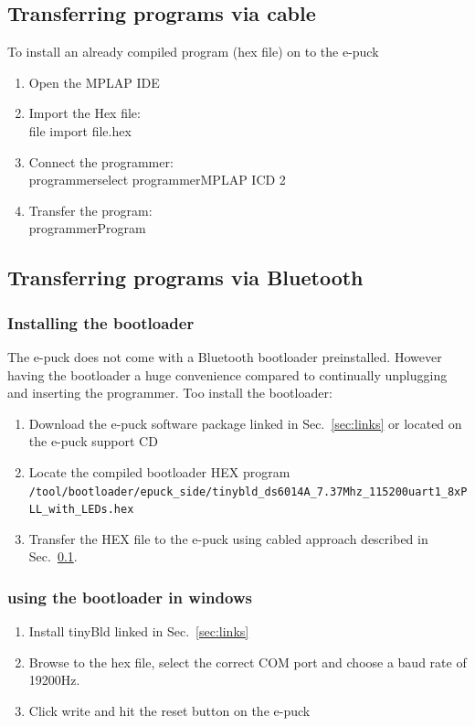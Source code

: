\documentclass{article}
\newcommand{\stt}[1]{{\small\tt #1}}
\begin{document}
\subsection{Transferring programs via cable}
\label{sec:transfering_cabel}
To install an already compiled program (hex file) on to the e-puck
\begin{enumerate}
\item Open the MPLAP IDE
\item Import the Hex file: 
\\ file \textrightarrow import \textrightarrow  file.hex
\item Connect the programmer: 
\\ programmer\textrightarrow select programmer\textrightarrow  MPLAP ICD 2
\item Transfer the program: 
\\ programmer\textrightarrow Program
\end{enumerate}


\subsection{Transferring programs via Bluetooth}
\subsubsection{Installing the bootloader}
The e-puck does not come with a Bluetooth bootloader preinstalled. However having the bootloader a huge convenience compared to continually unplugging and inserting the programmer.
%
Too install the bootloader:
\begin{enumerate}
\item Download the e-puck software package linked in Sec.~\ref{sec:links} or located on the e-puck support CD
\item Locate the compiled bootloader HEX program
\\ \stt{/tool/bootloader/epuck\_side/tinybld\_ds6014A\_7.37Mhz\_115200uart1\_8xPLL\_with\_LEDs.hex}
\item Transfer the HEX file to the e-puck using cabled approach described in Sec.~\ref{sec:transfering_cabel}.
\end{enumerate}

\subsubsection{using the bootloader in windows}
\begin{enumerate}
\item Install tinyBld linked in Sec.~\ref{sec:links}
\item Browse to the hex file, select the correct COM port and choose a baud rate of 19200Hz. 
\item Click write and hit the reset button on the e-puck 
\end{enumerate}
\end{document}
